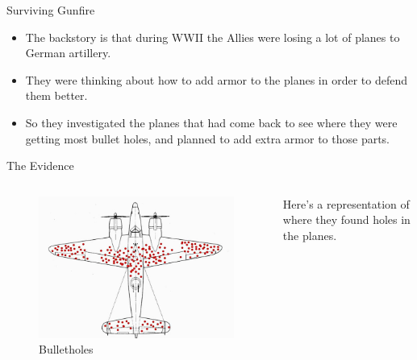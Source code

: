 \documentclass[
  ignorenonframetext,
]{beamer}
\providecommand{\tightlist}{%
  \setlength{\itemsep}{0pt}\setlength{\parskip}{0pt}}
\renewcommand{\,}{\text{, }}
\begin{document}
\begin{frame}{Surviving Gunfire}
\protect\hypertarget{surviving-gunfire}{}
\begin{itemize}
\tightlist
\item
  The backstory is that during WWII the Allies were losing a lot of
  planes to German artillery.
\item
  They were thinking about how to add armor to the planes in order to
  defend them better.
\item
  So they investigated the planes that had come back to see where they
  were getting most bullet holes, and planned to add extra armor to
  those parts.
\end{itemize}
\end{frame}

\begin{frame}{The Evidence}
\protect\hypertarget{the-evidence}{}
\begin{columns}[c]
\begin{column}{0.48\textwidth}
\begin{figure}
\centering
\includegraphics{../images/week10/wald_plane.jpg}
\caption{Bulletholes}
\end{figure}
\end{column}

\begin{column}{0.48\textwidth}
Here's a representation of where they found holes in the planes.
\end{column}
\end{columns}
\end{frame}
\end{document}
